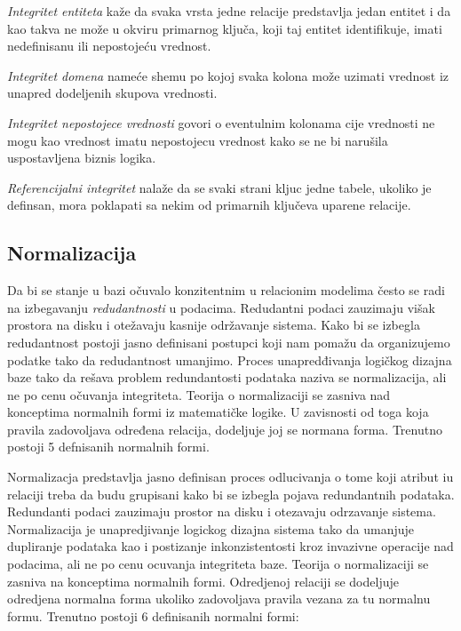 \documentclass[12pt,oneside]{memoir}
\begin{document}
 \textit{Integritet entiteta} kaže da svaka vrsta jedne relacije predstavlja jedan entitet i da kao takva ne može u okviru primarnog ključa, koji taj entitet identifikuje, imati nedefinisanu ili nepostojeću vrednost.

\textit{Integritet domena} nameće shemu po kojoj svaka kolona može uzimati vrednost iz unapred dodeljenih skupova vrednosti. 

\textit{Integritet nepostojece vrednosti} govori o eventulnim kolonama cije vrednosti ne mogu kao vrednost imatu nepostojecu vrednost kako se ne bi narušila uspostavljena biznis logika. 

\textit{Referencijalni integritet} nalaže da se svaki strani kljuc jedne tabele, ukoliko je definsan,  mora poklapati sa nekim od primarnih ključeva uparene relacije.

\subsection{Normalizacija}

Da bi se stanje u bazi očuvalo konzitentnim u relacionim modelima često se radi na izbegavanju \textit{redudantnosti} u podacima. Redudantni podaci zauzimaju višak prostora na disku i otežavaju kasnije održavanje sistema. Kako bi se izbegla redudantnost postoji jasno definisani postupci koji nam pomažu da organizujemo podatke tako da redudantnost umanjimo. Proces unapredđivanja logičkog dizajna baze tako da rešava problem redundantosti podataka naziva se normalizacija, ali ne po cenu očuvanja integriteta. Teorija o normalizaciji se zasniva nad konceptima normalnih formi iz matematičke logike. U zavisnosti od toga koja pravila zadovoljava određena relacija, dodeljuje joj se normana forma. Trenutno postoji 5 defnisanih normalnih formi. 

Normalizacja predstavlja jasno definisan proces odlucivanja o tome koji atribut iu relaciji treba da budu grupisani kako bi se izbegla pojava redundantnih podataka. Redundanti podaci zauzimaju prostor na disku i otezavaju odrzavanje sistema. Normalizacija je unapredjivanje  logickog dizajna sistema tako da umanjuje dupliranje podataka kao i postizanje inkonzistentosti kroz invazivne operacije nad podacima, ali ne po cenu ocuvanja integriteta baze. Teorija o normalizaciji se zasniva na konceptima normalnih formi. Odredjenoj relaciji se dodeljuje odredjena normalna forma ukoliko zadovoljava pravila vezana za tu normalnu formu. Trenutno postoji 6 definisanih normalni formi: 
\end{document}
